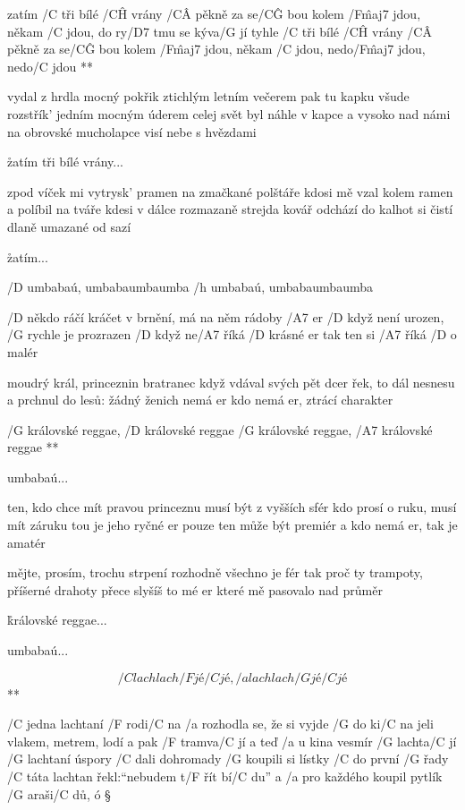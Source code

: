 \R  zatím /C tři bílé /C\^H vrány /C\^A pěkně za se/C\^G bou
    kolem /F\^{maj7} jdou, někam /C jdou, do ry/D7 tmu se kýva/G jí
    tyhle /C tři bílé /C\^H vrány /C\^A pěkně za se/C\^G bou
    kolem /F\^{maj7} jdou, někam /C jdou, nedo/F\^{maj7} jdou, nedo/C jdou **

vydal z hrdla mocný pokřik ztichlým letním večerem
pak tu kapku všude rozstřík' jedním mocným úderem
celej svět byl náhle v kapce a vysoko nad námi
na obrovské mucholapce visí nebe s hvězdami

\r zatím tři bílé vrány...

zpod víček mi vytrysk' pramen na zmačkané polštáře
kdosi mě vzal kolem ramen a políbil na tváře
kdesi v dálce rozmazaně strejda kovář odchází
do kalhot si čistí dlaně umazané od sazí

\r zatím...




/D umbabaú, umbabaumbaumba
/h umbabaú, umbabaumbaumba \s

/D někdo ráčí kráčet v brnění, má na něm rádoby /A7 er
/D když není urozen, /G  rychle je prozrazen
/D když ne/A7 říká /D krásné er
tak ten si /A7 říká /D o malér \s

moudrý král, princeznin bratranec
když vdával svých pět dcer
řek, to dál nesnesu a prchnul do lesů:
žádný ženich nemá er
kdo nemá er, ztrácí charakter

\R /G královské reggae, /D královské reggae
   /G královské reggae, /A7 královské reggae **

umbabaú... \s

ten, kdo chce mít pravou princeznu
musí být z vyšších sfér
kdo prosí o ruku, musí mít záruku
tou je jeho ryčné er
pouze ten může být premiér
a kdo nemá er, tak je amatér \s

mějte, prosím, trochu strpení
rozhodně všechno je fér
tak proč ty trampoty, příšerné drahoty
přece slyšíš to mé er
které mě pasovalo nad průměr

\r královské reggae...

umbabaú...




\R  \[ /C lach lach /F jé /C jé, /a lach lach /G jé /C jé \] **

/C jedna lachtaní /F rodi/C na
/a rozhodla se, že si vyjde /G do ki/C na
jeli vlakem, metrem, lodí a pak /F tramva/C jí
a teď /a u kina vesmír /G lachta/C jí
/G lachtaní úspory /C dali dohromady
/G koupili si lístky /C do první /G řady
/C táta lachtan řekl:``nebudem t/F řít bí/C du''
a /a pro každého koupil pytlík /G araši/C dů, ó \S


